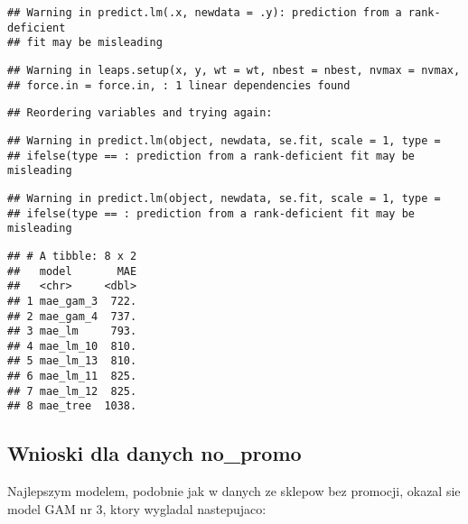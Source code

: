 \documentclass[]{article}
\begin{document}
\begin{verbatim}
## Warning in predict.lm(.x, newdata = .y): prediction from a rank-deficient
## fit may be misleading
\end{verbatim}

\begin{verbatim}
## Warning in leaps.setup(x, y, wt = wt, nbest = nbest, nvmax = nvmax,
## force.in = force.in, : 1 linear dependencies found
\end{verbatim}

\begin{verbatim}
## Reordering variables and trying again:
\end{verbatim}

\begin{verbatim}
## Warning in predict.lm(object, newdata, se.fit, scale = 1, type =
## ifelse(type == : prediction from a rank-deficient fit may be misleading
\end{verbatim}

\begin{verbatim}
## Warning in predict.lm(object, newdata, se.fit, scale = 1, type =
## ifelse(type == : prediction from a rank-deficient fit may be misleading
\end{verbatim}

\begin{verbatim}
## # A tibble: 8 x 2
##   model       MAE
##   <chr>     <dbl>
## 1 mae_gam_3  722.
## 2 mae_gam_4  737.
## 3 mae_lm     793.
## 4 mae_lm_10  810.
## 5 mae_lm_13  810.
## 6 mae_lm_11  825.
## 7 mae_lm_12  825.
## 8 mae_tree  1038.
\end{verbatim}

\hypertarget{wnioski-dla-danych-no_promo-1}{%
\subsection{Wnioski dla danych
no\_promo}\label{wnioski-dla-danych-no_promo-1}}

Najlepszym modelem, podobnie jak w danych ze sklepow bez promocji,
okazal sie model GAM nr 3, ktory wygladal nastepujaco:
\end{document}
